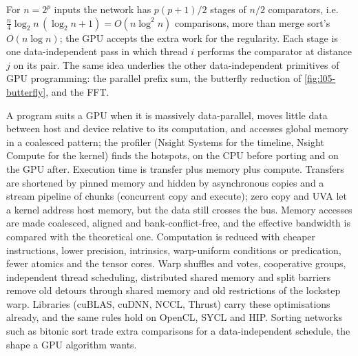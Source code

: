 \documentclass[../main.tex]{subfiles}
\begin{document}
For $n = 2^p$ inputs the network has $p(p+1)/2$ stages of $n/2$
comparators, i.e.\ $\frac{n}{4}\log_2 n\,(\log_2 n + 1) = O(n \log^2 n)$
comparisons, more than merge sort's $O(n \log n)$; the GPU accepts the
extra work for the regularity.  Each stage is one data-independent
pass in which thread $i$ performs the comparator at distance $j$ on its
pair.  The
same idea underlies the other data-independent primitives of GPU
programming: the parallel prefix sum, the butterfly reduction of
\cref{fig:l05-butterfly}, and the FFT.

\begin{keypoint}
  A program suits a GPU when it is massively data-parallel, moves little
  data between host and device relative to its computation, and accesses
  global memory in a coalesced pattern; the profiler (Nsight Systems for
  the timeline, Nsight Compute for the kernel) finds the hotspots, on
  the CPU before porting and on the GPU after.  Execution time is
  transfer plus memory plus compute.  Transfers are shortened by pinned
  memory and hidden by asynchronous copies and a stream pipeline of
  chunks (concurrent copy and execute); zero copy and UVA let a kernel
  address host memory, but the data still crosses the bus.  Memory
  accesses are made coalesced, aligned and bank-conflict-free, and the
  effective bandwidth is compared with the theoretical one.
  Computation is reduced with cheaper instructions, lower precision,
  intrinsics, warp-uniform conditions or predication, fewer atomics and
  the tensor cores.  Warp shuffles and votes, cooperative groups,
  independent thread scheduling, distributed shared memory and split
  barriers remove old detours through shared memory and old
  restrictions of the lockstep warp.  Libraries (cuBLAS, cuDNN, NCCL,
  Thrust) carry these optimisations already, and the same rules hold on
  OpenCL, SYCL and HIP.  Sorting networks such as bitonic sort trade
  extra comparisons for a data-independent schedule, the shape a GPU
  algorithm wants.
\end{keypoint}
\end{document}
